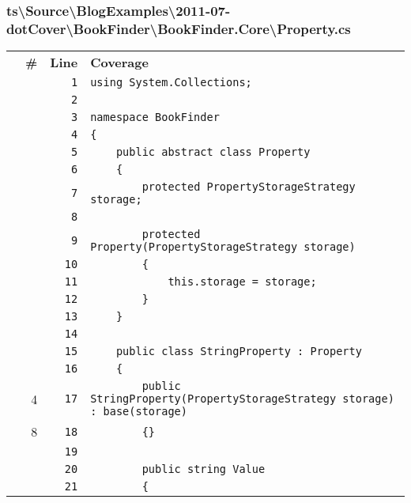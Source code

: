 \documentclass[a4paper,10pt]{article}
\begin{document}
\subsubsection{ts\textbackslash Source\textbackslash BlogExamples\textbackslash 2011-07-dotCover\textbackslash BookFinder\textbackslash BookFinder.Core\textbackslash Property.cs}
\begin{longtable}[l]{lrrl}
\textbf{} & \textbf{\#} & \textbf{Line} & \textbf{Coverage}\\
\cellcolor{gray} &  & \verb~1~ & \verb~using System.Collections;~\\
\cellcolor{gray} &  & \verb~2~ & \verb~~\\
\cellcolor{gray} &  & \verb~3~ & \verb~namespace BookFinder~\\
\cellcolor{gray} &  & \verb~4~ & \verb~{~\\
\cellcolor{gray} &  & \verb~5~ & \verb~    public abstract class Property~\\
\cellcolor{gray} &  & \verb~6~ & \verb~    {~\\
\cellcolor{gray} &  & \verb~7~ & \verb~        protected PropertyStorageStrategy storage;~\\
\cellcolor{gray} &  & \verb~8~ & \verb~~\\
\cellcolor{gray} &  & \verb~9~ & \verb~        protected Property(PropertyStorageStrategy storage)~\\
\cellcolor{gray} &  & \verb~10~ & \verb~        {~\\
\cellcolor{gray} &  & \verb~11~ & \verb~            this.storage = storage;~\\
\cellcolor{gray} &  & \verb~12~ & \verb~        }~\\
\cellcolor{gray} &  & \verb~13~ & \verb~    }~\\
\cellcolor{gray} &  & \verb~14~ & \verb~~\\
\cellcolor{gray} &  & \verb~15~ & \verb~    public class StringProperty : Property~\\
\cellcolor{gray} &  & \verb~16~ & \verb~    {~\\
\cellcolor{green} & 4 & \verb~17~ & \verb~        public StringProperty(PropertyStorageStrategy storage) : base(storage)~\\
\cellcolor{green} & 8 & \verb~18~ & \verb~        {}~\\
\cellcolor{gray} &  & \verb~19~ & \verb~~\\
\cellcolor{gray} &  & \verb~20~ & \verb~        public string Value~\\
\cellcolor{gray} &  & \verb~21~ & \verb~        {~\\

\end{longtable}
\end{document}
